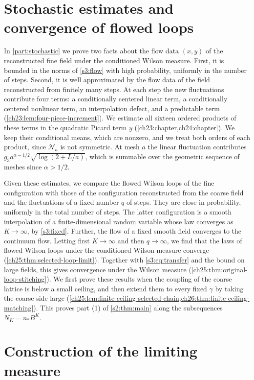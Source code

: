 \section{Stochastic estimates and convergence of flowed loops}\label{s3:stochastic}

In \cref{part:stochastic} we prove two facts about the flow data $(x,y)$ of the reconstructed fine field under the conditioned Wilson measure. First, it is bounded in the norms of \cref{s3:flow} with high probability, uniformly in the number of steps. Second, it is well approximated by the flow data of the field reconstructed from finitely many steps. At each step the new fluctuations contribute four terms: a conditionally centered linear term, a conditionally centered nonlinear term, an interpolation defect, and a predictable term (\cref{ch23:lem:four-piece-increment}). We estimate all sixteen ordered products of these terms in the quadratic Picard term $y$ (\cref{ch23:chapter,ch24:chapter}). We keep their conditional means, which are nonzero, and we treat both orders of each product, since $\mathcal N_a$ is not symmetric. At mesh $a$ the linear fluctuation contributes $g_3a^{\alpha-1/2}\sqrt{\log(2+L/a)}$, which is summable over the geometric sequence of meshes since $\alpha>1/2$.

Given these estimates, we compare the flowed Wilson loops of the fine configuration with those of the configuration reconstructed from the coarse field and the fluctuations of a fixed number $q$ of steps. They are close in probability, uniformly in the total number of steps. The latter configuration is a smooth interpolation of a finite-dimensional random variable whose law converges as $K\to\infty$, by \cref{s3:fixed}. Further, the flow of a fixed smooth field converges to the continuum flow. Letting first $K\to\infty$ and then $q\to\infty$, we find that the laws of flowed Wilson loops under the conditioned Wilson measure converge (\cref{ch25:thm:selected-loop-limit}). Together with \eqref{s3:eq:transfer} and the bound on large fields, this gives convergence under the Wilson measure (\cref{ch25:thm:original-loop-stitching}). We first prove these results when the coupling of the coarse lattice is below a small ceiling, and then extend them to every fixed $\gamma$ by taking the coarse side large (\cref{ch25:lem:finite-ceiling-selected-chain,ch26:thm:finite-ceiling-matching}). This proves part (1) of \cref{s2:thm:main} along the subsequences $N_K=n_*B^K$.

\section{Construction of the limiting measure}\label{s3:construction}

